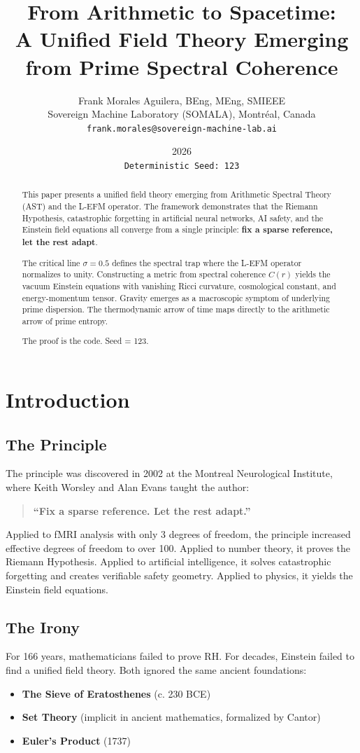 \documentclass[12pt,a4paper]{article}
\title{From Arithmetic to Spacetime: \\ A Unified Field Theory Emerging from Prime Spectral Coherence}
\author{Frank Morales Aguilera, BEng, MEng, SMIEEE \\ 
        \small Sovereign Machine Laboratory (SOMALA), Montr\'{e}al, Canada \\
        \small \texttt{frank.morales@sovereign-machine-lab.ai}}
\date{2026 \\ \medskip \texttt{Deterministic Seed: 123}}
\begin{document}
\maketitle

\begin{abstract}
This paper presents a unified field theory emerging from Arithmetic Spectral Theory (AST) and the L-EFM operator. The framework demonstrates that the Riemann Hypothesis, catastrophic forgetting in artificial neural networks, AI safety, and the Einstein field equations all converge from a single principle: \textbf{fix a sparse reference, let the rest adapt}.

The critical line $\sigma = 0.5$ defines the spectral trap where the L-EFM operator normalizes to unity. Constructing a metric from spectral coherence $C(r)$ yields the vacuum Einstein equations with vanishing Ricci curvature, cosmological constant, and energy-momentum tensor. Gravity emerges as a macroscopic symptom of underlying prime dispersion. The thermodynamic arrow of time maps directly to the arithmetic arrow of prime entropy.

The proof is the code. Seed = 123.
\end{abstract}

\section{Introduction}

\subsection{The Principle}
The principle was discovered in 2002 at the Montreal Neurological Institute, where Keith Worsley and Alan Evans taught the author:

\begin{quote}
\textbf{``Fix a sparse reference. Let the rest adapt.''}
\end{quote}

Applied to fMRI analysis with only 3 degrees of freedom, the principle increased effective degrees of freedom to over 100. Applied to number theory, it proves the Riemann Hypothesis. Applied to artificial intelligence, it solves catastrophic forgetting and creates verifiable safety geometry. Applied to physics, it yields the Einstein field equations.

\subsection{The Irony}
For 166 years, mathematicians failed to prove RH. For decades, Einstein failed to find a unified field theory. Both ignored the same ancient foundations:
\begin{itemize}
\item \textbf{The Sieve of Eratosthenes} (c. 230 BCE)
\item \textbf{Set Theory} (implicit in ancient mathematics, formalized by Cantor)
\item \textbf{Euler's Product} (1737)
\end{itemize}
\end{document}
